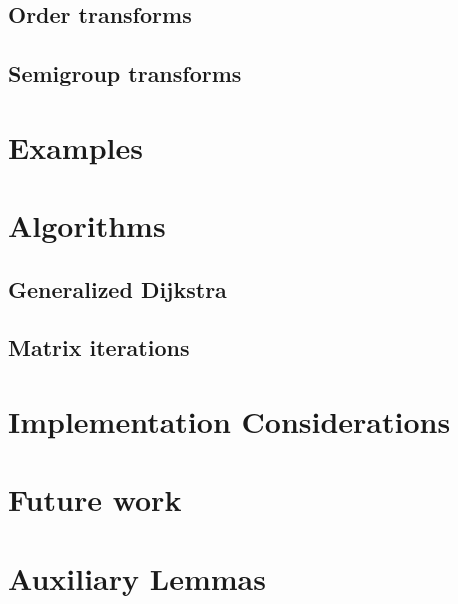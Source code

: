 \documentclass[10pt]{article}
\begin{document}
\subsection{Order transforms} 
\label{sec:ordertransforms:rules} 

\subsection{Semigroup transforms} 
\label{sec:semigrouptransforms:rules} 


\section{Examples}
\label{sec:examples} 

\section{Algorithms}
\label{sec:algorithms} 

\subsection{Generalized Dijkstra}
\label{sec:dijkstra} 

\subsection{Matrix iterations}
\label{sec:iterate} 

\section{Implementation Considerations}
\label{sec:implement} 


\section{Future work}
\label{sec:conclude} 
 


 

\appendix 

\section{Auxiliary Lemmas}
\label{sec:lemmas} 
 
\end{document}
